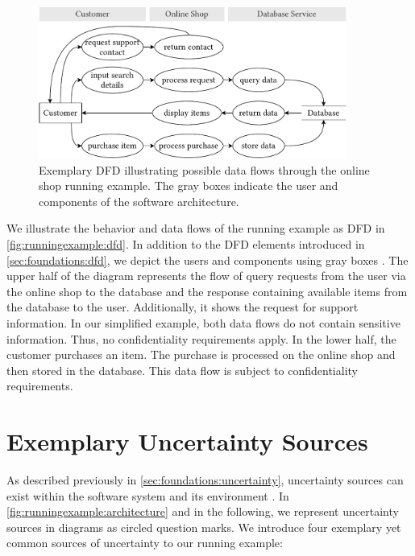 \begin{figure}
    \centering
    \includegraphics[width=0.9\textwidth]{figures/chapter3/onlineshop-dfd.pdf}
    \caption[Exemplary \acf*{DFD} of the running example.]{Exemplary \acf*{DFD} illustrating possible data flows through the online shop running example. The gray boxes indicate the user and components of the software architecture.}
    \label{fig:runningexample:dfd}
\end{figure}

We illustrate the behavior and data flows of the running example as \acf{DFD} in \autoref{fig:runningexample:dfd}.
In addition to the \ac{DFD} elements introduced in \autoref{sec:foundations:dfd}, we depict the users and components using gray boxes \cite{seifermann_architectural_2022}.
The upper half of the diagram represents the flow of query requests from the user via the online shop to the database and the response containing available items from the database to the user.
Additionally, it shows the request for support information.
In our simplified example, both data flows do not contain sensitive information.
Thus, no confidentiality requirements apply.
In the lower half, the customer purchases an item.
The purchase is processed on the online shop and then stored in the database.
This data flow is subject to confidentiality requirements.





\section{Exemplary Uncertainty Sources}%
\label{sec:runningexample:uncertainty}

As described previously in \autoref{sec:foundations:uncertainty}, uncertainty sources can exist within the software system and its environment \cite{acosta_uncertainty_2022}.
In \autoref{fig:runningexample:architecture} and in the following, we represent uncertainty sources in diagrams as circled question marks.
We introduce four exemplary yet common sources of uncertainty to our running example:

